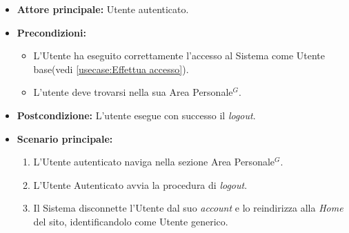 \label{usecase:Logout}
\begin{itemize}
	\item \textbf{Attore principale:} Utente autenticato.

	\item \textbf{Precondizioni:}
	\begin{itemize}
        \item L'Utente ha eseguito correttamente l'accesso al Sistema come Utente base(vedi \autoref{usecase:Effettua accesso}).
        \item L'utente deve trovarsi nella sua Area Personale$^G$.
    \end{itemize}

	\item \textbf{Postcondizione:} L'utente esegue con successo il \textit{logout}.

	\item \textbf{Scenario principale:}
	      \begin{enumerate}
		      \item L'Utente autenticato naviga nella sezione Area Personale$^G$.
		      \item L'Utente Autenticato avvia la procedura di \textit{logout}.
              \item Il Sistema disconnette l'Utente dal suo \textit{account} e lo reindirizza alla \textit{Home} del sito, identificandolo come Utente generico.
	      \end{enumerate}
\end{itemize}
